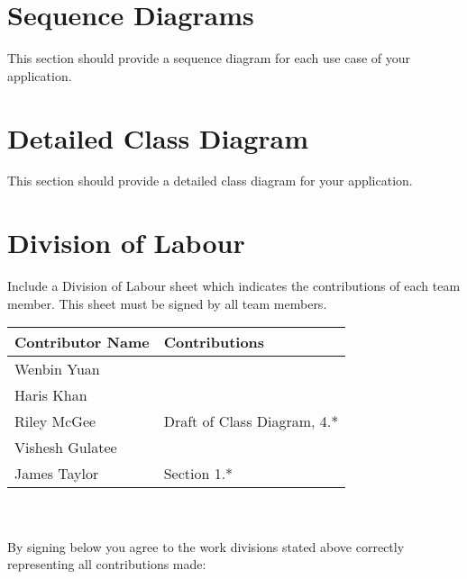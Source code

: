 \documentclass[]{article}
\begin{document}
\section{Sequence Diagrams}
\label{sec:sequence_diagrams}
This section should provide a sequence diagram for each use case of your application.

\section{Detailed Class Diagram}
\label{sec:detailed_class_diagram}
This section should provide a detailed class diagram for your application.

\appendix
\section{Division of Labour}
\label{sec:division_of_labour}
Include a Division of Labour sheet which indicates the contributions of each team member. This sheet must be signed by all team members.


\begin{tabular}{ | l | l | }
\hline
	\textbf{Contributor Name} & \textbf{Contributions}  \\
  	\hline
  	Wenbin Yuan &  \\
  	\hline
  	Haris Khan &  \\
  	\hline
		Riley McGee & Draft of Class Diagram, 4.* \\
  	\hline
		Vishesh Gulatee &  \\
  	\hline
		James Taylor & Section 1.* \\
  	\hline
\end{tabular}
\\
\\
By signing below you agree to the work divisions stated above correctly representing all contributions made:



\newpage
\end{document}
